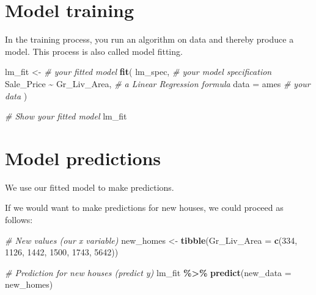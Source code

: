 \documentclass[
]{book}
\newenvironment{Shaded}{\begin{snugshade}}{\end{snugshade}}
\newcommand{\CommentTok}[1]{\textcolor[rgb]{0.56,0.35,0.01}{\textit{#1}}}
\newcommand{\DataTypeTok}[1]{\textcolor[rgb]{0.13,0.29,0.53}{#1}}
\newcommand{\DecValTok}[1]{\textcolor[rgb]{0.00,0.00,0.81}{#1}}
\newcommand{\KeywordTok}[1]{\textcolor[rgb]{0.13,0.29,0.53}{\textbf{#1}}}
\newcommand{\NormalTok}[1]{#1}
\newcommand{\OperatorTok}[1]{\textcolor[rgb]{0.81,0.36,0.00}{\textbf{#1}}}
\newcommand{\StringTok}[1]{\textcolor[rgb]{0.31,0.60,0.02}{#1}}
\begin{document}
\hypertarget{model-training}{%
\section{Model training}\label{model-training}}

In the training process, you run an algorithm on data and thereby produce a model. This process is also called model fitting.

\begin{Shaded}
\begin{Highlighting}[]
\NormalTok{lm\_fit \textless{}{-}}\StringTok{ }\CommentTok{\# your fitted model}
\StringTok{  }\KeywordTok{fit}\NormalTok{(}
\NormalTok{    lm\_spec, }\CommentTok{\# your model specification}
\NormalTok{    Sale\_Price }\OperatorTok{\textasciitilde{}}\StringTok{ }\NormalTok{Gr\_Liv\_Area, }\CommentTok{\# a Linear Regression formula}
    \DataTypeTok{data =}\NormalTok{ ames }\CommentTok{\# your data}
\NormalTok{  )}

\CommentTok{\# Show your fitted model}
\NormalTok{lm\_fit}
\end{Highlighting}
\end{Shaded}

\hypertarget{model-predictions}{%
\section{Model predictions}\label{model-predictions}}

We use our fitted model to make predictions.

\begin{Shaded}
\end{Shaded}

If we would want to make predictions for new houses, we could proceed as follows:

\begin{Shaded}
\begin{Highlighting}[]
\CommentTok{\# New values (our x variable)}
\NormalTok{new\_homes \textless{}{-}}
\StringTok{  }\KeywordTok{tibble}\NormalTok{(}\DataTypeTok{Gr\_Liv\_Area =} \KeywordTok{c}\NormalTok{(}\DecValTok{334}\NormalTok{, }\DecValTok{1126}\NormalTok{, }\DecValTok{1442}\NormalTok{, }\DecValTok{1500}\NormalTok{, }\DecValTok{1743}\NormalTok{, }\DecValTok{5642}\NormalTok{))}

\CommentTok{\# Prediction for new houses (predict y)}
\NormalTok{lm\_fit }\OperatorTok{\%\textgreater{}\%}
\StringTok{  }\KeywordTok{predict}\NormalTok{(}\DataTypeTok{new\_data =}\NormalTok{ new\_homes)}
\end{Highlighting}
\end{Shaded}
\end{document}
